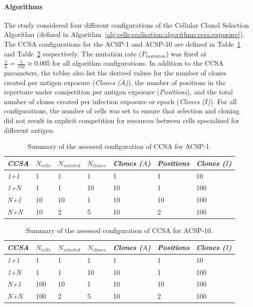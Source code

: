 \paragraph{Algorithms}
The study considered four different configurations of the Cellular Clonal Selection Algorithm (defined in Algorithm~\ref{alg:cells:realisation:algorithms:ccsa:exposure}). The CCSA configurations for the ACSP-1 and ACSP-10 are defined in Table~\ref{tab:cells:clonalselection:ccsa:aep1} and Table~\ref{tab:cells:clonalselection:ccsa:aep10} respectively. The mutation rate ($P_{mutation}$) was fixed at $\frac{1}{L}=\frac{1}{192}\approx0.005$ for all algorithm configurations. In addition to the CCSA parameters, the tables also list the derived values for the number of clones created per antigen exposure (\emph{Clones ($A$)}), the number of positions in the repertoire under competition per antigen exposure (\emph{Positions}), and the total number of clones created per infection exposure or epoch (\emph{Clones ($I$)}). For all configurations, the number of cells was set to ensure that selection and cloning did not result in explicit competition for resources between cells specialised for different antigen.

\begin{table}[ht]
	\centering\small
		\begin{tabular}{lllllll}
		\toprule
		\emph{CCSA} & $N_{cells}$ & $N_{selected}$ & $N_{clones}$ & \emph{Clones ($A$)} & \emph{Positions} & \emph{Clones ($I$)} \\ 
		\toprule
		\emph{1+1} & 1 & 1 & 1 & 1 & 1 & 10 \\ 
		\emph{1+N} & 1 & 1 & 10 & 10 & 1 & 100 \\ 
		\emph{N+1} & 10 & 10 & 1 & 10 & 10 & 100 \\ 
		\emph{N+N} & 10 & 2 & 5 & 10 & 2 & 100 \\ 
		\bottomrule
		\end{tabular}
	\caption{Summary of the assessed configuration of CCSA for ACSP-1.}
	\label{tab:cells:clonalselection:ccsa:aep1}
\end{table}

\begin{table}[ht]
	\centering\small
		\begin{tabular}{lllllll}
		\toprule
		\emph{CCSA} & $N_{cells}$ & $N_{selected}$ & $N_{clones}$ & \emph{Clones ($A$)} & \emph{Positions} & \emph{Clones ($I$)} \\ 
		\toprule
		\emph{1+1} & 1 & 1 & 1 & 1 & 1 & 10 \\ 
		\emph{1+N} & 1 & 1 & 10 & 10 & 1 & 100 \\ 
		\emph{N+1} & 100 & 10 & 1 & 10 & 10 & 100 \\ 
		\emph{N+N} & 100 & 2 & 5 & 10 & 2 & 100 \\ 
		\bottomrule
		\end{tabular}
	\caption{Summary of the assessed configuration of CCSA for ACSP-10.}
	\label{tab:cells:clonalselection:ccsa:aep10}
\end{table}


